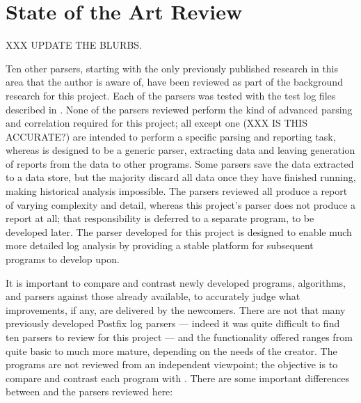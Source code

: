 \section{State of the Art Review}

\label{state of the art review}

XXX UPDATE THE BLURBS\@.

Ten other parsers, starting with the only previously published research in
this area that the author is aware of, have been reviewed as part of the
background research for this project.  Each of the parsers was tested with
the \numberOFlogFILES{} test log files described in .  None of the parsers reviewed perform the kind of advanced
parsing and correlation required for this project; all except one (XXX IS
THIS ACCURATE\@?) are intended to perform a specific parsing and reporting
task, whereas \PLP{} is designed to be a generic parser, extracting data
and leaving generation of reports from the data to other programs.  Some
parsers save the data extracted to a data store, but the majority discard
all data once they have finished running, making historical analysis
impossible.  The parsers reviewed all produce a report of varying
complexity and detail, whereas this project's parser does not produce a
report at all; that responsibility is deferred to a separate program, to be
developed later.  The parser developed for this project is designed to
enable much more detailed log analysis by providing a stable platform for
subsequent programs to develop upon.

It is important to compare and contrast newly developed programs,
algorithms, and parsers against those already available, to accurately
judge what improvements, if any, are delivered by the newcomers.  There are
not that many previously developed Postfix log parsers --- indeed it was
quite difficult to find ten parsers to review for this project --- and the
functionality offered ranges from quite basic to much more mature,
depending on the needs of the creator.  The programs are not reviewed from
an independent viewpoint; the objective is to compare and contrast each
program with \parsername{}.  There are some important differences between
\parsername{} and the parsers reviewed here:

